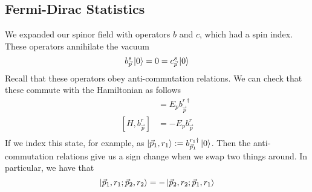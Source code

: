 \subsection{Fermi-Dirac Statistics} 
We expanded our spinor field with operators $ b  $ and $ c $, which 
had a spin index. These operators annihilate the vacuum 
\[
b_{ \vec{p} } ^ s \ket{ 0 }  = 0 =  c_{ \vec{p} } ^ s \ket{ 0 } 
\] Recall that these operators obey anti-commutation relations. 
We can check that these commute with the Hamiltonian as follows 
\begin{align*}
[ H , b_{ \vec{p} } ^{ r \dagger } ] &=  E _p b _{ \vec{p} } ^{ r \dagger }  \\ 
\left[  H , b_{ \vec{p} } ^{ r  }  \right]  &=   - E _ p b_{ \vec{p} } ^ r  \\ 
\end{align*}
If we index this state, for example, as $ \ket{ \vec{p} _ 1, r _ 1 } : = b_{ \vec{p} _ 1 } ^{ r _ 1 \dagger } \ket{ 0 }  $. 
Then the anti-commutation relations give us a sign change when 
we swap two things around. In particular, 
we have that 
\[
\ket{ \vec{p} _ 1 , r _ 1 ; \vec{p} _ 2 , r _ 2 } =  - \ket{ \vec{p} _ 2 , r _ 2 ; \vec{p} _ 1 , r _ 1 } 
\]   

